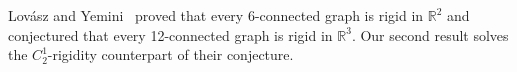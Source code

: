 \documentclass{daj}
\newtheorem{theorem}[thm]{Theorem}\theoremstyle{plain}
\newcommand{\sm}{{\setminus}}
\newcommand{\R}{\mathbb{R}}
\newcommand{\val}{{\rm val}}
\begin{document}
%
%
%
%

Lov{\'a}sz and Yemini~\cite{LY82} proved that every 6-connected graph is rigid in $\R^2$ and conjectured that every 12-connected graph is rigid in $\R^3$.
Our second result solves the $C_2^1$-rigidity counterpart of their conjecture.
\end{document}

